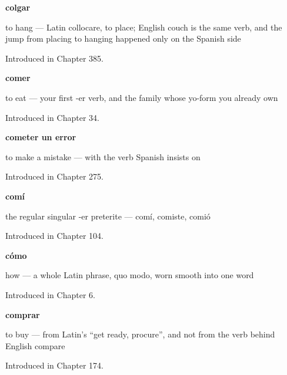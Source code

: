 \noindent\begin{minipage}[t]{\linewidth}
\raggedright
\textbf{colgar}\par
\small to hang — Latin collocare, to place; English couch is the same verb, and the jump from placing to hanging happened only on the Spanish side\par
\footnotesize Introduced in Chapter 385.
\end{minipage}\par\medskip

\noindent\begin{minipage}[t]{\linewidth}
\raggedright
\textbf{comer}\par
\small to eat — your first -er verb, and the family whose yo-form you already own\par
\footnotesize Introduced in Chapter 34.
\end{minipage}\par\medskip

\noindent\begin{minipage}[t]{\linewidth}
\raggedright
\textbf{cometer un error}\par
\small to make a mistake — with the verb Spanish insists on\par
\footnotesize Introduced in Chapter 275.
\end{minipage}\par\medskip

\noindent\begin{minipage}[t]{\linewidth}
\raggedright
\textbf{comí}\par
\small the regular singular -er preterite — comí, comiste, comió\par
\footnotesize Introduced in Chapter 104.
\end{minipage}\par\medskip

\noindent\begin{minipage}[t]{\linewidth}
\raggedright
\textbf{cómo}\par
\small how — a whole Latin phrase, quo modo, worn smooth into one word\par
\footnotesize Introduced in Chapter 6.
\end{minipage}\par\medskip

\noindent\begin{minipage}[t]{\linewidth}
\raggedright
\textbf{comprar}\par
\small to buy — from Latin's \textquotedblleft{}get ready, procure\textquotedblright{}, and not from the verb behind English compare\par
\footnotesize Introduced in Chapter 174.
\end{minipage}\par\medskip

